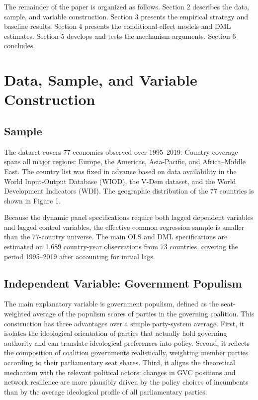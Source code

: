 \documentclass[12pt]{article}
\begin{document}
The remainder of the paper is organized as follows. Section 2 describes the data, sample, and variable construction. Section 3 presents the empirical strategy and baseline results. Section 4 presents the conditional-effect models and DML estimates. Section 5 develops and tests the mechanism arguments. Section 6 concludes.

\section{Data, Sample, and Variable Construction}

\subsection{Sample}

The dataset covers 77 economies observed over 1995--2019. Country coverage spans all major regions: Europe, the Americas, Asia-Pacific, and Africa--Middle East. The country list was fixed in advance based on data availability in the World Input-Output Database (WIOD), the V-Dem dataset, and the World Development Indicators (WDI). The geographic distribution of the 77 countries is shown in Figure 1.

Because the dynamic panel specifications require both lagged dependent variables and lagged control variables, the effective common regression sample is smaller than the 77-country universe. The main OLS and DML specifications are estimated on 1,689 country-year observations from 73 countries, covering the period 1995--2019 after accounting for initial lags.

\subsection{Independent Variable: Government Populism}

The main explanatory variable is government populism, defined as the seat-weighted average of the populism scores of parties in the governing coalition. This construction has three advantages over a simple party-system average. First, it isolates the ideological orientation of parties that actually hold governing authority and can translate ideological preferences into policy. Second, it reflects the composition of coalition governments realistically, weighting member parties according to their parliamentary seat shares. Third, it aligns the theoretical mechanism with the relevant political actors: changes in GVC positions and network resilience are more plausibly driven by the policy choices of incumbents than by the average ideological profile of all parliamentary parties.
\end{document}
